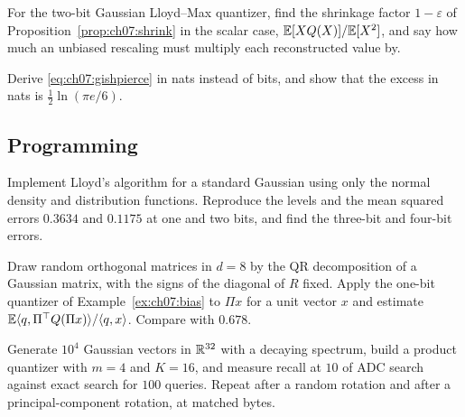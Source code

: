 \begin{exercise}\label{exr:ch07:8}
For the two-bit Gaussian Lloyd--Max quantizer, find the shrinkage factor $1-\varepsilon$ of Proposition~\ref{prop:ch07:shrink} in the scalar case, $\mathbb{E}[XQ(X)]/\mathbb{E}[X^2]$, and say how much an unbiased rescaling must multiply each reconstructed value by.
\end{exercise}

\begin{exercise}\label{exr:ch07:9}
Derive \cref{eq:ch07:gishpierce} in nats instead of bits, and show that the excess in nats is $\frac12\ln(\pi e/6)$.
\end{exercise}

\subsection*{Programming}

\begin{exercise}\label{exr:ch07:10}
Implement Lloyd's algorithm for a standard Gaussian using only the normal density and distribution functions. Reproduce the levels and the mean squared errors $0.3634$ and $0.1175$ at one and two bits, and find the three-bit and four-bit errors.
\end{exercise}

\begin{exercise}\label{exr:ch07:11}
Draw random orthogonal matrices in $d=8$ by the QR decomposition of a Gaussian matrix, with the signs of the diagonal of $R$ fixed. Apply the one-bit quantizer of Example~\ref{ex:ch07:bias} to $\Pi x$ for a unit vector $x$ and estimate $\mathbb{E}\langle q,\Pi^{\top} Q(\Pi x)\rangle/\langle q,x\rangle$. Compare with $0.678$.
\end{exercise}

\begin{exercise}\label{exr:ch07:12}
Generate $10^4$ Gaussian vectors in $\mathbb{R}^{32}$ with a decaying spectrum, build a product quantizer with $m=4$ and $K=16$, and measure recall at $10$ of ADC search against exact search for $100$ queries. Repeat after a random rotation and after a principal-component rotation, at matched bytes.
\end{exercise}


